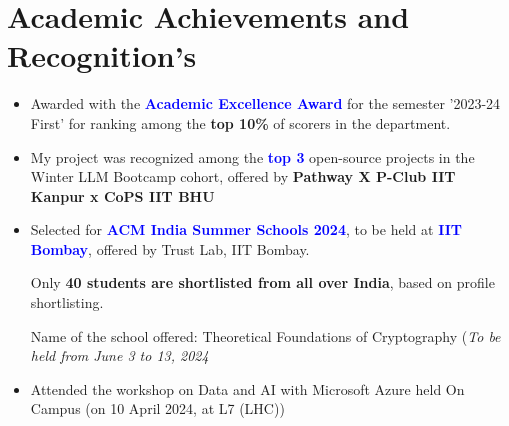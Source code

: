 \documentclass[10.8pt, a4paper]{extarticle}
\newcommand{\shorterSection}[1]{\vspace{-10pt}\section{#1}}
\begin{document}
\shorterSection{Academic Achievements and Recognition's}
\begin{itemize}

 \item Awarded with the \textcolor{blue}{\textbf{Academic Excellence Award}} for the semester '2023-24 First' for ranking among the \textbf{top 10\%} of scorers in the department.\href{https://www.iitk.ac.in/sspc/data/2nd-list-of-Academic-Excellence-Awards-2023-21-03-24.pdf}{\faLink{}}\\[-0.6cm]
 
 
  \item My project was recognized among the \textcolor{blue}{\textbf{top 3 }}open-source projects in the Winter LLM Bootcamp cohort, offered by \textbf{Pathway X P-Club IIT Kanpur x CoPS IIT BHU} \href{https://t.certifier.io/CL0/https:%2F%2Fapi.credsverse.com%2Fv1%2Fusers%2Finvite%2Fceed2b44-26ae-4085-a1c6-291760efed0a/1/0102018ede88dc5e-89a09bd7-6cea-4807-a2c9-3dff747834d9-000000/_U00joiSf7_qp3anDSJNAiO00y7Hxm7ONFmpv6zOP2g=348}{\faLink{}}\\[-0.6cm]


    \item Selected for \textcolor{blue}{\textbf{ACM India Summer Schools 2024}}, to be held at \textcolor{blue}{\textbf{IIT Bombay}}, offered by Trust Lab, IIT Bombay. \href{https://drive.google.com/file/d/1Zrw9ZEbpcHit9Pn9m18AO0EXmoZq-p33/view?usp=sharing}{\faLink{}}
    
    Only \textbf{40 students are shortlisted from all over India}, based on profile shortlisting. 
    
    Name of the school offered: Theoretical Foundations of Cryptography \hfill\hfill(\textit{To be held from June 3 to 13, 2024}\\[-0.6cm]

  \item Attended the workshop on Data and AI with Microsoft Azure held On Campus (on 10 April 2024, at L7 (LHC))\\[-0.6cm]


\end{itemize}
\medskip



\end{document}
